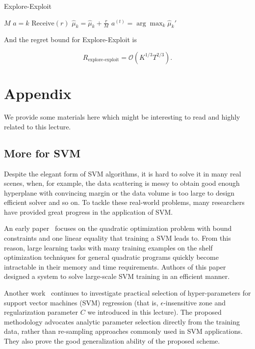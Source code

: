 \documentclass[11pt]{article}
\begin{document}
\begin{algorithm}[H]
\caption{Explore-Exploit}
\label{algo:exp2}
\begin{algorithmic}[1]
\REQUIRE $M$
\STATE $a = k$
\STATE $\text{Receive}(r)$
\STATE $\widehat{\mu}_k = \widehat{\mu}_k + \frac{r}{M}$
\ENDFOR
\ENDFOR
{}
\STATE $a^{(t)} = \arg\max_{k}\widehat{\mu}_k'$
\ENDFOR
\end{algorithmic}
\end{algorithm}

And the regret bound for Explore-Exploit is 

\begin{equation}
    R_{\text{explore-exploit}} = \mathcal{O}(K^{1/3}T^{2/3}).
\end{equation}


{


}

\newpage
\section{Appendix}
We provide some materials here which might be interesting to read and highly related to this lecture. 

\subsection{More for SVM}
Despite the elegant form of SVM algorithms, it is hard to solve it in many real scenes, when, for example, the data scattering is messy to obtain good enough hyperplane with convincing margin or the data volume is too large to design efficient solver and so on. To tackle these real-world problems, many researchers have provided great progress in the application of SVM. 

An early paper~\cite{joachims1998making} focuses on the quadratic optimization problem with bound constraints and one linear equality that training a SVM leads to. From this reason, large learning tasks with many training examples on the shelf optimization techniques for general quadratic programs quickly become intractable in their memory and time requirements. Authors of this paper designed a system to solve large-scale SVM training in an efficient manner.  

Another work~\cite{cherkassky2004practical} continues to investigate practical selection of hyper-parameters for support vector machines (SVM) regression (that is, $\epsilon$-insensitive zone and regularization parameter $C$ we introduced in this lecture). The proposed methodology advocates analytic parameter selection directly from the training data, rather than re-sampling approaches commonly used in SVM applications. They also prove the good generalization ability of the proposed scheme.
\end{document}
